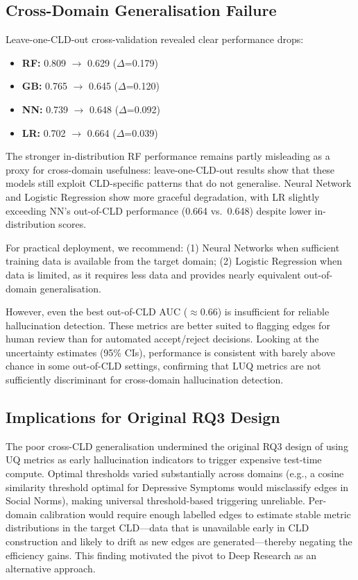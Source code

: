 \subsection{Cross-Domain Generalisation Failure}

Leave-one-CLD-out cross-validation revealed clear performance drops:
\begin{itemize}[noitemsep]
    \item \textbf{RF:} 0.809 $\rightarrow$ 0.629 ($\Delta$=0.179)
    \item \textbf{GB:} 0.765 $\rightarrow$ 0.645 ($\Delta$=0.120)
    \item \textbf{NN:} 0.739 $\rightarrow$ 0.648 ($\Delta$=0.092)
    \item \textbf{LR:} 0.702 $\rightarrow$ 0.664 ($\Delta$=0.039)
\end{itemize}

The stronger in-distribution RF performance remains partly misleading as a proxy for cross-domain usefulness: leave-one-CLD-out results show that these models still exploit CLD-specific patterns that do not generalise. Neural Network and Logistic Regression show more graceful degradation, with LR slightly exceeding NN's out-of-CLD performance (0.664 vs.\ 0.648) despite lower in-distribution scores.

For practical deployment, we recommend: (1) Neural Networks when sufficient training data is available from the target domain; (2) Logistic Regression when data is limited, as it requires less data and provides nearly equivalent out-of-domain generalisation.

However, even the best out-of-CLD AUC ($\approx$0.66) is insufficient for reliable hallucination detection. These metrics are better suited to flagging edges for human review than for automated accept/reject decisions. Looking at the uncertainty estimates (95\% CIs), performance is consistent with barely above chance in some out-of-CLD settings, confirming that LUQ metrics are not sufficiently discriminant for cross-domain hallucination detection.

\subsection{Implications for Original RQ3 Design}

The poor cross-CLD generalisation undermined the original RQ3 design of using UQ metrics as early hallucination indicators to trigger expensive test-time compute. Optimal thresholds varied substantially across domains (e.g., a cosine similarity threshold optimal for Depressive Symptoms would misclassify edges in Social Norms), making universal threshold-based triggering unreliable. Per-domain calibration would require enough labelled edges to estimate stable metric distributions in the target CLD---data that is unavailable early in CLD construction and likely to drift as new edges are generated---thereby negating the efficiency gains. This finding motivated the pivot to Deep Research as an alternative approach.

